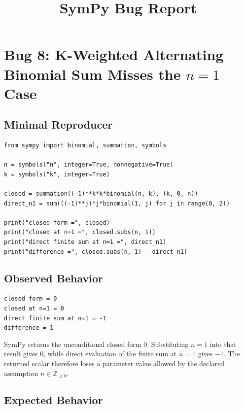\documentclass[11pt]{article}
\title{SymPy Bug Report}
\author{}
\date{}
\begin{document}
\maketitle

\section{Bug 8: K-Weighted Alternating Binomial Sum Misses the \texorpdfstring{\(n=1\)}{n=1} Case}

\subsection{Minimal Reproducer}

\medskip

\begin{lstlisting}[style=bugpython]
from sympy import binomial, summation, symbols

n = symbols("n", integer=True, nonnegative=True)
k = symbols("k", integer=True)

closed = summation((-1)**k*k*binomial(n, k), (k, 0, n))
direct_n1 = sum(((-1)**j)*j*binomial(1, j) for j in range(0, 2))

print("closed form =", closed)
print("closed at n=1 =", closed.subs(n, 1))
print("direct finite sum at n=1 =", direct_n1)
print("difference =", closed.subs(n, 1) - direct_n1)
\end{lstlisting}

\subsection{Observed Behavior}

\medskip

\begin{lstlisting}[style=bugpython]
closed form = 0
closed at n=1 = 0
direct finite sum at n=1 = -1
difference = 1
\end{lstlisting}

SymPy returns the unconditional closed form \(0\).  Substituting \(n=1\) into
that result gives \(0\), while direct evaluation of the finite sum at \(n=1\)
gives \(-1\).  The returned scalar therefore loses a parameter value allowed
by the declared assumption \(n \in \mathbb{Z}_{\ge 0}\).

\subsection{Expected Behavior}
\end{document}
